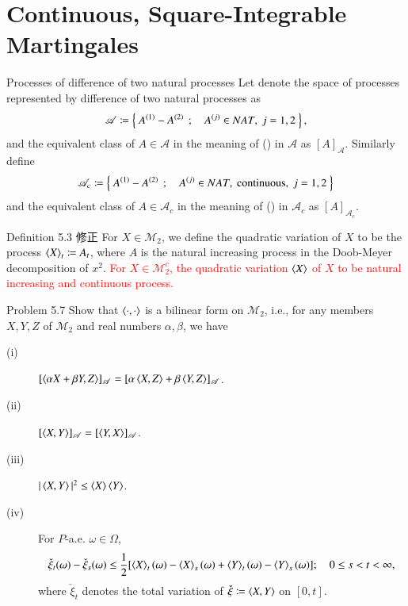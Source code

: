\section{Continuous, Square-Integrable Martingales}
	\begin{itembox}[l]{Processes of difference of two natural processes}
		Let denote the space of processes represented by difference of two natural processes as
		\begin{align}
			\mathscr{A} \coloneqq \left\{\ A^{(1)} - A^{(2)}\ \, ; \quad A^{(j)} \in NAT,\ j=1,2\ \right\},
		\end{align}
		and the equivalent class of $A \in \mathscr{A}$ in the meaning of
		() in $\mathscr{A}$ as
		$[A]_{\mathscr{A}}$. Similarly define
		\begin{align}
			\mathscr{A}_c \coloneqq \left\{\ A^{(1)} - A^{(2)}\ \, ; \quad A^{(j)} \in NAT,\ \mbox{continuous},\ j=1,2\ \right\}
		\end{align}
		and the equivalent class of $A \in \mathscr{A}_c$ in the meaning of
		() in $\mathscr{A}_c$ as
		$[A]_{\mathscr{A}_c}$.
	\end{itembox}
	
	\begin{itembox}[l]{Definition 5.3 修正}
		For $X \in \mathscr{M}_2$, we define the quadratic variation of $X$ to be the process $\inprod<X>_t \coloneqq A_t$,
		where $A$ is the natural increasing process in the Doob-Meyer decomposition of $x^2$.
		\textcolor{red}{For $X \in \mathscr{M}_2^c$, the quadratic variation $\inprod<X>$ of $X$ 
		to be natural increasing and continuous process.}
	\end{itembox}
	
	\begin{itembox}[l]{Problem 5.7}
		Show that $\inprod<\cdot,\cdot>$ is a bilinear form on $\mathscr{M}_2$, i.e.,
		for any members $X,Y,Z$ of $\mathscr{M}_2$ and real numbers $\alpha,\beta$, we have
		\begin{description}
			\item[(i)] $[\inprod<\alpha X + \beta Y,Z>]_{\mathscr{A}} 
				= [\alpha \inprod<X,Z> + \beta \inprod<Y,Z>]_{\mathscr{A}}$.
			\item[(ii)] $[\inprod<X,Y>]_{\mathscr{A}} = [\inprod<Y,X>]_{\mathscr{A}}$.
			\item[(iii)] $|\inprod<X,Y>|^2 \leq \inprod<X> \inprod<Y>$.
			\item[(iv)] For $P$-a.e. $\omega \in \Omega$,
				\begin{align}
					\check{\xi}_t(\omega) - \check{\xi}_s(\omega)
					\leq \frac{1}{2}[\inprod<X>_t(\omega) - \inprod<X>_s(\omega)
						+ \inprod<Y>_t(\omega) - \inprod<Y>_s(\omega)];
						\quad 0 \leq s < t < \infty,
				\end{align}
				where $\check{\xi}_t$ denotes the total variation of 
				$\check{\xi} \coloneqq \inprod<X,Y>$ on $[0,t]$.
		\end{description}
	\end{itembox}
	
